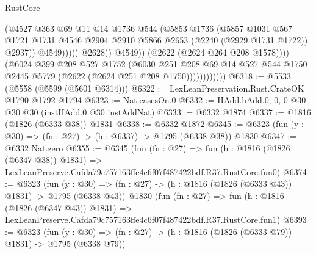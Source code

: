 \begin{lexlean}{RustCore}
\begin{coremodule}
                                        (@4527
                                          @363
                                          @69
                                          @11
                                          @14
                                          @1736
                                          @544
                                          (@5853
                                            @1736
                                            (@5857
                                              @1031
                                              @567
                                              @1721
                                              @1731
                                              @4546
                                              @2904
                                              @2910
                                              @5866
                                              @2653
                                              (@2240 (@2929 @1731 @1722))
                                              @2937))
                                          @4549)))))
                                @2628))
                            @4549))
                        (@2622 (@2624 @264 @208 @1578))))
                    (@6024
                      @399
                      @208
                      @527
                      @1752
                      (@6030
                        @251
                        @208
                        @69
                        @14
                        @527
                        @544
                        @1750
                        @2445
                        @5779
                        (@2622 (@2624 @251 @208 @1750))))))))))))
@6318 := @5533 (@5558 (@5599 (@5601 @6314)))
@6322 := LexLeanPreservation.Rust.CrateOK @1790 @1792 @1794
@6323 := Nat.casesOn.{0}
@6332 := HAdd.hAdd.{0, 0, 0} @30 @30 @30 (instHAdd.{0} @30 instAddNat)
@6333 := @6332 @1874
@6337 := @1816 (@1826 (@6333 @38)) @1831
@6338 := @6332 @1872
@6345 := @6323 (fun (y : @30) => (fn : @27) -> (h : @6337) -> @1795 (@6338 @38)) @1830
@6347 := @6332 Nat.zero
@6355 := @6345
    (fun (fn : @27) =>
    fun (h : @1816 (@1826 (@6347 @38)) @1831) =>
    LexLeanPreserve.Cafda79c757163ffe4c6f07f487422bdf.R37.RustCore.fun0)
@6374 := @6323
    (fun (y : @30) => (fn : @27) -> (h : @1816 (@1826 (@6333 @43)) @1831) -> @1795 (@6338 @43))
    @1830
    (fun (fn : @27) =>
    fun (h : @1816 (@1826 (@6347 @43)) @1831) =>
    LexLeanPreserve.Cafda79c757163ffe4c6f07f487422bdf.R37.RustCore.fun1)
@6393 := @6323
    (fun (y : @30) => (fn : @27) -> (h : @1816 (@1826 (@6333 @79)) @1831) -> @1795 (@6338 @79))

\end{coremodule}
\end{lexlean}
